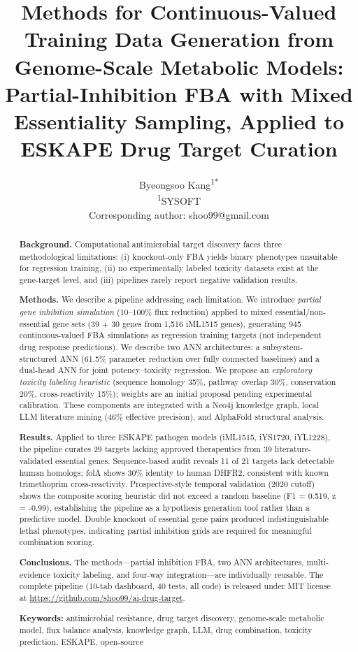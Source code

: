 \documentclass[12pt,a4paper]{article}
\title{Methods for Continuous-Valued Training Data Generation from Genome-Scale Metabolic Models: Partial-Inhibition FBA with Mixed Essentiality Sampling, Applied to ESKAPE Drug Target Curation}
\author{
Byeongsoo Kang\textsuperscript{1*}\\
\small\textsuperscript{1}SYSOFT\\
\small *Corresponding author: shoo99@gmail.com
}
\date{}
\begin{document}
\maketitle

\begin{abstract}
\textbf{Background.} Computational antimicrobial target discovery faces three methodological limitations: (i) knockout-only FBA yields binary phenotypes unsuitable for regression training, (ii) no experimentally labeled toxicity datasets exist at the gene-target level, and (iii) pipelines rarely report negative validation results.

\textbf{Methods.} We describe a pipeline addressing each limitation. We introduce \textit{partial gene inhibition simulation} (10--100\% flux reduction) applied to mixed essential/non-essential gene sets (39 + 30 genes from 1,516 iML1515 genes), generating 945 continuous-valued FBA simulations as regression training targets (not independent drug response predictions). We describe two ANN architectures: a subsystem-structured ANN (61.5\% parameter reduction over fully connected baselines) and a dual-head ANN for joint potency--toxicity regression. We propose an \textit{exploratory toxicity labeling heuristic} (sequence homology 35\%, pathway overlap 30\%, conservation 20\%, cross-reactivity 15\%); weights are an initial proposal pending experimental calibration. These components are integrated with a Neo4j knowledge graph, local LLM literature mining (46\% effective precision), and AlphaFold structural analysis.

\textbf{Results.} Applied to three ESKAPE pathogen models (iML1515, iYS1720, iYL1228), the pipeline curates 29 targets lacking approved therapeutics from 39 literature-validated essential genes. Sequence-based audit reveals 11 of 21 targets lack detectable human homologs; folA shows 30\% identity to human DHFR2, consistent with known trimethoprim cross-reactivity. Prospective-style temporal validation (2020 cutoff) shows the composite scoring heuristic did not exceed a random baseline (F1 = 0.519, z = -0.99), establishing the pipeline as a hypothesis generation tool rather than a predictive model. Double knockout of essential gene pairs produced indistinguishable lethal phenotypes, indicating partial inhibition grids are required for meaningful combination scoring.

\textbf{Conclusions.} The methods---partial inhibition FBA, two ANN architectures, multi-evidence toxicity labeling, and four-way integration---are individually reusable. The complete pipeline (10-tab dashboard, 40 tests, all code) is released under MIT license at \url{https://github.com/shoo99/ai-drug-target}.

\medskip
\noindent\textbf{Keywords:} antimicrobial resistance, drug target discovery, genome-scale metabolic model, flux balance analysis, knowledge graph, LLM, drug combination, toxicity prediction, ESKAPE, open-source
\end{abstract}
\end{document}
